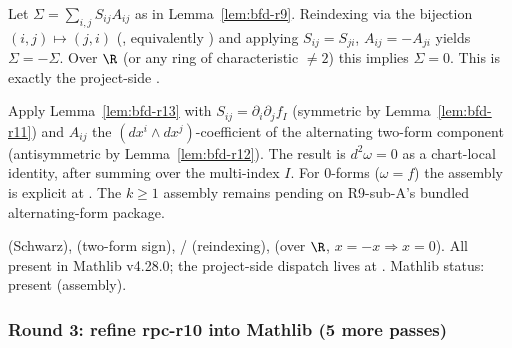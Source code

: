 \begin{lemma}[Pass bfd.13: explicit cancellation $\Sigma=-\Sigma$ over $\R$]
\label{lem:bfd-r13}
Let $\Sigma=\sum_{i,j}S_{ij}A_{ij}$ as in Lemma~\ref{lem:bfd-r9}.
Reindexing via the bijection $(i,j)\mapsto (j,i)$
(, equivalently ) and
applying $S_{ij}=S_{ji}$, $A_{ij}=-A_{ji}$ yields $\Sigma=-\Sigma$.
Over $\R$ (or any ring of characteristic $\neq 2$) this implies
$\Sigma=0$.  This is exactly the project-side
.
\leanok\mathlibok
\end{lemma}

\begin{lemma}[Pass bfd.14: assembling the chart-local $d^{2}=0$]
\label{lem:bfd-r14}
Apply Lemma~\ref{lem:bfd-r13} with
$S_{ij}=\partial_{i}\partial_{j}f_{I}$ (symmetric by
Lemma~\ref{lem:bfd-r11}) and $A_{ij}$ the
$(dx^{i}\wedge dx^{j})$-coefficient of the alternating two-form
component (antisymmetric by Lemma~\ref{lem:bfd-r12}).  The result is
$d^{2}\omega=0$ as a chart-local identity, after summing over the
multi-index $I$.  For 0-forms ($\omega = f$) the assembly is
explicit at
.
The $k\geq 1$ assembly remains pending on R9-sub-A's bundled
alternating-form package.
\leanok
\end{lemma}

\begin{lemma}
\label{lem:bfd-r15}
 (Schwarz),
 (two-form sign),
 /  (reindexing),
 (over $\R$, $x=-x\Rightarrow x=0$).  All
present in Mathlib v4.28.0; the project-side dispatch lives at
.  Mathlib status: present (assembly).
\leanok\mathlibok
\end{lemma}

\subsubsection*{Round 3: refine rpc-r10 into Mathlib (5 more passes)}

